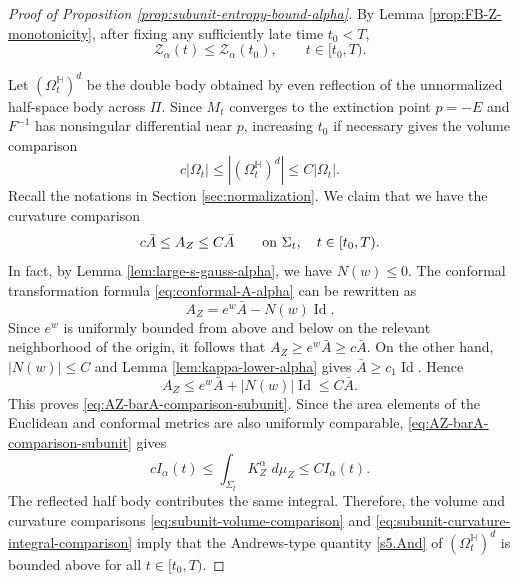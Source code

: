 \documentclass[11pt, reqno]{amsart}
\theoremstyle{remark}
\theoremstyle{definition}
\numberwithin{equation}{section}
\newcommand{\Id}{\operatorname{Id}}
\newcommand{\HH}{\mathbb H}
\newcommand{\PiH}{\Pi}
\newcommand{\dd}{\,d}
\begin{document}
\begin{proof}[Proof of Proposition \ref{prop:subunit-entropy-bound-alpha}]
 By Lemma \ref{prop:FB-Z-monotonicity}, after fixing any sufficiently late time $t_0<T$,
	\begin{equation*}
		\mathcal Z_\alpha(t)
		\le \mathcal Z_\alpha(t_0),
		\qquad t\in[t_0,T).
	\end{equation*}
	
	Let $(\Omega_t^{\HH})^d$ be the double body obtained by even reflection of the unnormalized half-space body across $\PiH$.  Since $M_t$ converges to the extinction point $p=-E$ and $F^{-1}$ has nonsingular differential near $p$, increasing $t_0$ if necessary gives the volume comparison
	\begin{equation}\label{eq:subunit-volume-comparison}
		c|\Omega_t|\le |(\Omega_t^{\HH})^d|\le C|\Omega_t|.
	\end{equation}
	Recall the notations in Section \ref{sec:normalization}.  We claim that we have the curvature comparison
	\begin{equation}\label{eq:AZ-barA-comparison-subunit}
		c\bar A\le A_Z\le C\bar A
		\qquad\hbox{on }\Sigma_t,
		\quad t\in[t_0,T).
	\end{equation}
In fact, by Lemma \ref{lem:large-s-gauss-alpha}, we have $N(w)\leq0$. The conformal transformation
formula \eqref{eq:conformal-A-alpha} can be rewritten as
\begin{equation*}
	A_Z=e^w\bar A-N(w)\Id.
\end{equation*}
Since $e^w$ is uniformly bounded from above and below on the relevant
neighborhood of the origin, it follows that $A_Z\geq e^w\bar A\geq c\bar A$.  
On the other hand, $|N(w)|\leq C$ and Lemma \ref{lem:kappa-lower-alpha} gives
$\bar A\geq c_1\Id$. Hence
\begin{equation*}
	A_Z
	\leq e^w\bar A+|N(w)|\Id
	\leq C\bar A.
\end{equation*}
This proves \eqref{eq:AZ-barA-comparison-subunit}. Since the area
elements of the Euclidean and conformal metrics are also uniformly
comparable, \eqref{eq:AZ-barA-comparison-subunit} gives
	\begin{equation}\label{eq:subunit-curvature-integral-comparison}
		cI_\alpha(t)
		\le \int_{\Sigma_t}K_Z^\alpha\,\dd \mu_Z
		\le CI_\alpha(t).
	\end{equation}
	The reflected half body contributes the same integral. Therefore, the volume and curvature comparisons \eqref{eq:subunit-volume-comparison} and
	\eqref{eq:subunit-curvature-integral-comparison} imply that the Andrews-type quantity \eqref{s5.And} of $(\Omega_t^{\HH})^d$ is bounded above for all $ t\in[t_0,T)$.  

\end{proof}
\end{document}
